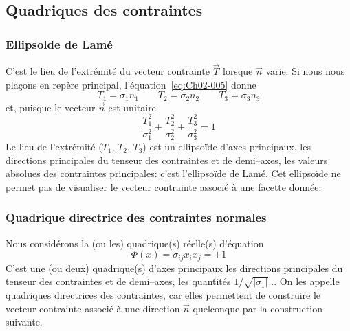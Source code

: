 \subsection{Quadriques des contraintes} \label{ssec:Ch02-2.1}
\subsubsection{Ellipsolde de Lamé}
C'est le lieu de l'extrémité du vecteur contrainte $\vec{T}$ lorsque $\vec{n}$ varie.
Si nous nous plaçons en repère principal, l'équation~\eqref{eq:Ch02-005} donne 
\begin{equation*}
    T_1 = \sigma_1 n_1 \qquad T_2 = \sigma_2 n_2 \qquad T_3 = \sigma_3 n_3
\end{equation*}
et, puisque le vecteur $\vec{n}$ est unitaire 
\begin{equation}
    \frac{T_1^2}{\sigma_1^2} + \frac{T_2^2}{\sigma_2^2} + \frac{T_3^2}{\sigma_3^2} = 1
    \label{eq:Ch02-023}
\end{equation}
Le lieu de l'extrémité ($T_1$, $T_2$, $T_3$) est un ellipsoïde d'axes principaux, les directions principales du tenseur des contraintes et de demi--axes, les valeurs absolues des contraintes principales: c'est l'ellipsoïde de Lamé.
Cet ellipsoïde ne permet pas de visualiser le vecteur contrainte associé à une facette donnée.
\subsubsection{Quadrique directrice des contraintes normales}
Nous considérons la (ou les) quadrique(s) réelle(s) d'équation 
\begin{equation}
    \Phi(x) = \sigma_{ij} x_i x_j = \pm 1
    \label{eq:Ch02-024}
\end{equation}
C'est une (ou deux) quadrique(s) d'axes principaux les directions principales du tenseur des contraintes et de demi--axes, les quantités $1/\sqrt{|\sigma_1|}$...
On les appelle quadriques directrices des contraintes, car elles permettent de construire le vecteur contrainte associé à une direction $\vec{n}$ quelconque par la construction suivante. 

